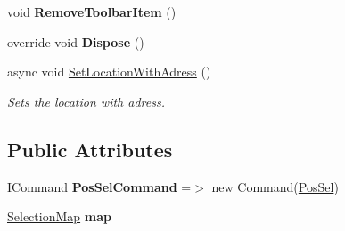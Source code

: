 \begin{DoxyCompactItemize}
void {\bfseries Remove\+Toolbar\+Item} ()
\item 
\mbox{\label{class_tutor_scout24_1_1_view_models_1_1_create_view_model_a712c72048ee79fd25c170838487fffc1}} 
override void {\bfseries Dispose} ()
\item 
async void \mbox{\hyperlink{class_tutor_scout24_1_1_view_models_1_1_create_view_model_ad2021b575ac16ac9877b1b29e2fe8e6a}{Set\+Location\+With\+Adress}} ()
\begin{DoxyCompactList}\small\item\em Sets the location with adress. \end{DoxyCompactList}\end{DoxyCompactItemize}
\subsection*{Public Attributes}
\begin{DoxyCompactItemize}
\item 
\mbox{\label{class_tutor_scout24_1_1_view_models_1_1_create_view_model_a8479f4d285e9b743085a037d59fd1c25}} 
I\+Command {\bfseries Pos\+Sel\+Command} =$>$ new Command(\mbox{\hyperlink{class_tutor_scout24_1_1_view_models_1_1_create_view_model_a5002145ea2bc96424f202caee461f810}{Pos\+Sel}})
\item 
\mbox{\label{class_tutor_scout24_1_1_view_models_1_1_create_view_model_aad8f0b81c0749f3ffef8ea25c97370ad}} 
\mbox{\hyperlink{class_tutor_scout24_1_1_controls_1_1_selection_map}{Selection\+Map}} {\bfseries map}
\end{DoxyCompactItemize}
